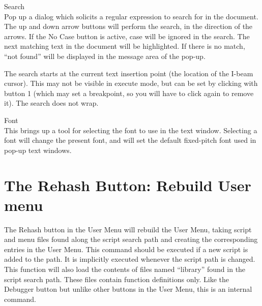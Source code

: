 \begin{description}
\item{\cb Search}\\
Pop up a dialog which solicits a regular expression to search for in
the document.  The up and down arrow buttons will perform the search,
in the direction of the arrows.  If the {\cb No Case} button is
active, case will be ignored in the search.  The next matching text in
the document will be highlighted.  If there is no match, ``not found''
will be displayed in the message area of the pop-up.

The search starts at the current text insertion point (the
location of the I-beam cursor).  This may not be visible in
execute mode, but can be set by clicking with button 1 (which may
set a breakpoint, so you will have to click again to remove it).
The search does not wrap.

\item{Font}\\
This brings up a tool for selecting the font to use in the text
window.  Selecting a font will change the present font, and will
set the default fixed-pitch font used in pop-up text windows.
\end{description}


\section{The {\cb Rehash} Button: Rebuild User menu}

The {\cb Rehash} button in the {\cb User Menu} will rebuild the {\cb
User Menu}, taking script and menu files found along the script search
path and creating the corresponding entries in the {\cb User Menu}. 
This command should be executed if a new script is added to the path. 
It is implicitly executed whenever the script path is changed.  This
function will also load the contents of files named ``{\vt library}''
found in the script search path.  These files contain function
definitions only.  Like the {\cb Debugger} button but unlike other
buttons in the {\cb User Menu}, this is an internal command.

